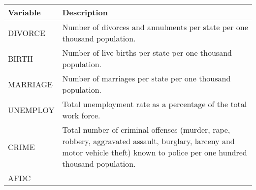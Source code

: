 \documentclass[]{book}
\begin{document}
\begin{longtable}[]{@{}ll@{}}
\toprule
\begin{minipage}[b]{0.06\columnwidth}\raggedright
Variable\strut
\end{minipage} & \begin{minipage}[b]{0.88\columnwidth}\raggedright
Description\strut
\end{minipage}\tabularnewline
\midrule
\endhead
\begin{minipage}[t]{0.06\columnwidth}\raggedright
DIVORCE\strut
\end{minipage} & \begin{minipage}[t]{0.88\columnwidth}\raggedright
Number of divorces and annulments per state per one thousand population.\strut
\end{minipage}\tabularnewline
\begin{minipage}[t]{0.06\columnwidth}\raggedright
BIRTH\strut
\end{minipage} & \begin{minipage}[t]{0.88\columnwidth}\raggedright
Number of live births per state per one thousand population.\strut
\end{minipage}\tabularnewline
\begin{minipage}[t]{0.06\columnwidth}\raggedright
MARRIAGE\strut
\end{minipage} & \begin{minipage}[t]{0.88\columnwidth}\raggedright
Number of marriages per state per one thousand population.\strut
\end{minipage}\tabularnewline
\begin{minipage}[t]{0.06\columnwidth}\raggedright
UNEMPLOY\strut
\end{minipage} & \begin{minipage}[t]{0.88\columnwidth}\raggedright
Total unemployment rate as a percentage of the total work force.\strut
\end{minipage}\tabularnewline
\begin{minipage}[t]{0.06\columnwidth}\raggedright
CRIME\strut
\end{minipage} & \begin{minipage}[t]{0.88\columnwidth}\raggedright
Total number of criminal offenses (murder, rape, robbery, aggravated assault, burglary, larceny and motor vehicle theft) known to police per one hundred thousand population.\strut
\end{minipage}\tabularnewline
\begin{minipage}[t]{0.06\columnwidth}\raggedright
AFDC\strut

\end{minipage}
\end{longtable}
\end{document}
